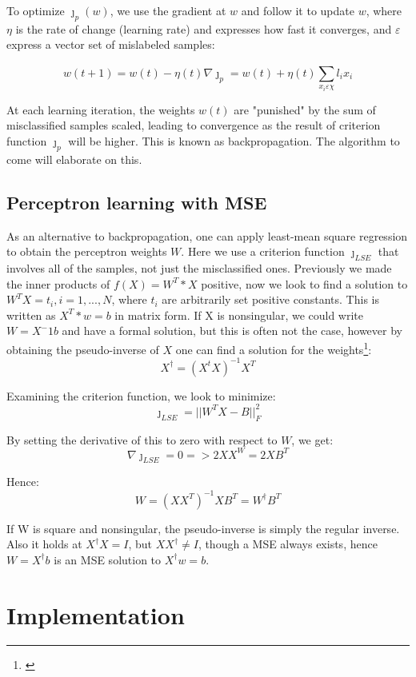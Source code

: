 \documentclass[journal]{IEEEtran}
\begin{document}
To optimize ${\jmath}_{p}(w)$, we use the gradient at $w$ and follow it to update $w$, where $\eta$ is the rate of change (learning rate) and expresses how fast it converges, and $\varepsilon$ express a vector set of mislabeled samples:

$$ w(t+1) = w(t) - \eta(t) \nabla{\jmath}_{p} = w(t) + \eta(t) \sum_{x_{i} \varepsilon \chi}^{} l_{i} x_{i} $$

At each learning iteration, the weights $w(t)$ are "punished" by the sum of misclassified samples scaled, leading to convergence as the result of criterion function ${\jmath}_{p}$ will be higher. This is known as backpropagation. The algorithm to come will elaborate on this.

\subsection{Perceptron learning with MSE}

As an alternative to backpropagation, one can apply least-mean square regression to obtain the perceptron weights $W$. Here we use a criterion function ${\jmath}_{LSE}$ that involves all of the samples, not just the misclassified ones. Previously we made the inner products of $f(X) = W^T*X$ positive, now we look to find a solution to $W^T X = t_{i}, i = 1, ..., N$, where $t_{i}$ are arbitrarily set positive constants. This is written as $X^T*w = b$ in matrix form. If X is nonsingular, we could write $W = X^-1 b$ and have a formal solution, but this is often not the case, however by obtaining the pseudo-inverse of $X$ one can find a solution for the weights\footnote{\cite{Duda2012}}: $$ X^\dagger = (X^tX)^{-1}X^T $$

Examining the criterion function, we look to minimize: $$ {\jmath}_{LSE} = ||W^T X - B||^2_{F} $$

By setting the derivative of this to zero with respect to $W$, we get: $$ \nabla{\jmath}_{LSE} = 0 => 2XX^W = 2XB^T $$

Hence: $$ W = (XX^T)^{-1} XB^T = W^\dagger B^T $$

If W is square and nonsingular, the pseudo-inverse is simply the regular inverse. Also it holds at $X^\dagger X = I$, but $X X^\dagger \neq I$, though a MSE always exists, hence $W = X^\dagger b$ is an MSE solution to $X^\dagger w = b$.

\section{Implementation}
\end{document}
